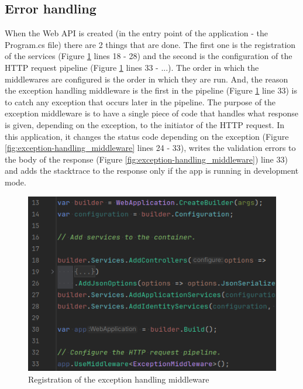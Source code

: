 \subsection{Error handling}

\par When the Web API is created (in the entry point of the application - the Program.cs file) there are 2 things that are done. The first one is the registration of the services (Figure \ref{fig:exception-handling_registration} lines 18 - 28) and the second is the configuration of the HTTP request pipeline (Figure \ref{fig:exception-handling_registration} lines 33 - ...). The order in which the middlewares are configured is the order in which they are run. And, the reason the exception handling middleware is the  first in the pipeline (Figure \ref{fig:exception-handling_registration} line 33) is to catch any exception that occurs later in the pipeline. The purpose of the exception middleware is to have a single piece of code that handles what response is given, depending on the exception, to the initiator of the HTTP request. In this application, it changes the status code depending on the exception (Figure \ref{fig:exception-handling_middleware} lines 24 - 33), writes the validation errors to the body of the response (Figure \ref{fig:exception-handling_middleware}) line  33) and adds the stacktrace to the response only if the app is running in development mode.

\begin{figure}
    \centering
    \includegraphics[width=1\linewidth]{exception-handling_registration.png}
    \caption{Registration of the exception handling middleware}
    \label{fig:exception-handling_registration}
\end{figure}

